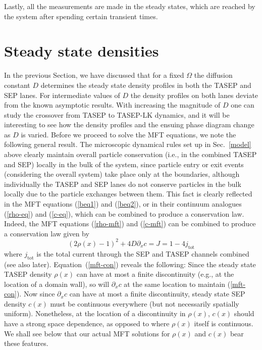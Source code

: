 \documentclass[aps,pre,twocolumn,superscriptaddress,amsmath,amssymb,longbibliography,floatfix,nofootinbib]{revtex4}
\begin{document}
 { Lastly, all the measurements are made in the steady states, which are reached by the system after spending certain transient times. 
 
\section{Steady state densities}\label{steady}








In the previous Section, we have discussed  that for a fixed $\Omega$ the diffusion constant $D$ determines the steady state density profiles in both the TASEP and SEP lanes. For intermediate values of  $D$ the density
profiles on both lanes deviate from the known asymptotic results. With increasing the magnitude of $D$ one can study 
the crossover from TASEP to TASEP-LK dynamics, and it will be interesting to 
see how the density profiles and the ensuing phase diagram change as $D$ is varied. Before we proceed to solve the MFT equations, we note the following general result. The microscopic dynamical rules set up in Sec.~\ref{model} above clearly maintain overall particle conservation (i.e., in the combined TASEP and SEP) locally in the bulk of the system, since particle entry or exit events (considering the overall system) take place only at the boundaries, although individually the TASEP and SEP lanes do not conserve particles in the bulk locally due to the particle exchanges between them. This fact is clearly reflected in the MFT equations (\ref{beq1}) and (\ref{beq2}), or in their continuum analogues (\ref{rho-eq}) and (\ref{c-eq}), which can be combined to produce a conservation law. Indeed, the MFT equations (\ref{rho-mft}) and (\ref{c-mft}) can be combined to produce a conservation law given by
\begin{equation}
 (2\rho(x)-1)^2 + 4D \partial_x c = J=1-4j_\text{tot}\label{mft-con}
\end{equation}
where $j_\text{tot}$ is the total current through the SEP and TASEP channels combined (see also later). Equation~(\ref{mft-con}) reveals the following: Since the steady state TASEP density $\rho(x)$ can have at most a finite discontinuity (e.g., at the location of a domain wall), so will $\partial_x c$ at the same location to maintain (\ref{mft-con}). Now since $\partial_x c$ can have at most a finite discontinuity, steady state SEP density $c(x)$ must be continuous everywhere (but not necessarily spatially uniform). Nonetheless, at the location of a discontinuity in $\rho(x)$, $c(x)$ should have a strong space dependence, as opposed to where $\rho(x)$ itself is continuous. We shall see below that our actual MFT solutions for $\rho(x)$ and $c(x)$ bear these features.  

}
\end{document}
